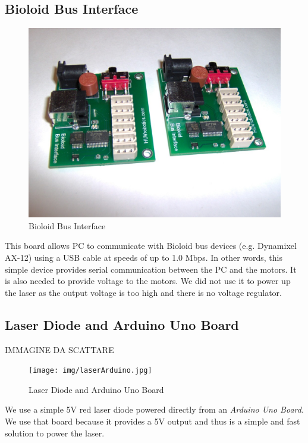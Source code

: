 \subsection{Bioloid Bus Interface}
\begin{figure}
	\centering
	\includegraphics[width=\textwidth]{img/busInterface.jpg}%
	\caption{Bioloid Bus Interface}
	\label{fig:busInterface}
\end{figure}
This board allows PC to communicate with Bioloid bus devices (e.g. Dynamixel AX-12) using a USB cable at speeds of up to 1.0 Mbps. In other words,
this simple device provides serial communication between the PC and the motors. It is also needed to provide voltage to the motors. We did not use it to power up the laser as the output voltage is too high and there is no voltage regulator.
\subsection{Laser Diode and Arduino Uno Board}
IMMAGINE DA SCATTARE\\
\begin{figure}
	\centering
	\texttt{[image: img/laserArduino.jpg]}%
	\caption{Laser Diode and Arduino Uno Board}
	\label{fig:laserArduino}
\end{figure}
We use a simple 5V red laser diode powered directly from an \emph{Arduino Uno Board}. We use that board because it provides a 5V output and thus is a simple and fast solution to power the laser.
